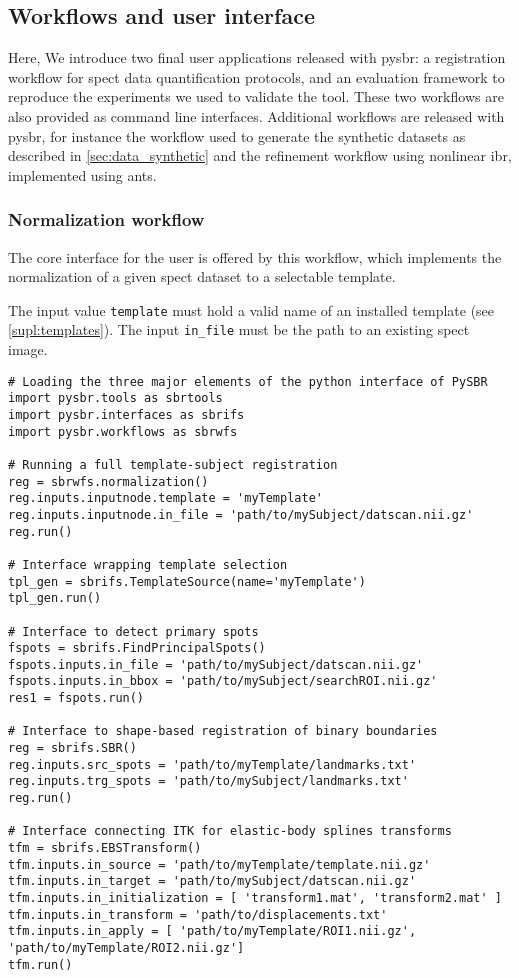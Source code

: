 \documentclass{frontiers}
\begin{document}
\subsection{Workflows and user interface}
\label{supl:user_interface}

Here, We introduce two final user
  applications released with \gls*{pysbr}: a registration workflow for
  \gls*{spect} data quantification protocols, and an evaluation framework
  to reproduce the experiments we used to validate the tool.
These two workflows are also provided as command line interfaces.
Additional workflows are released with \gls*{pysbr}, for instance
  the workflow used to generate the synthetic datasets as described
  in \autoref{sec:data_synthetic} and the refinement workflow using
  nonlinear \gls*{ibr}, implemented using \gls*{ants}.

\subsubsection*{Normalization workflow} %
The core interface for the user is offered by this workflow,
  which implements the normalization of a given \gls*{spect} 
  dataset to a selectable template.

The input value \texttt{template} must hold a valid name of an installed 
  template (see \autoref{supl:templates}). 
The input \texttt{in\_file} must be the path to an existing \gls*{spect} image.

\begin{lstlisting}[caption={\label{list:interfaces}\textbf{Execution samples.}}]
# Loading the three major elements of the python interface of PySBR
import pysbr.tools as sbrtools
import pysbr.interfaces as sbrifs
import pysbr.workflows as sbrwfs

# Running a full template-subject registration
reg = sbrwfs.normalization()
reg.inputs.inputnode.template = 'myTemplate'
reg.inputs.inputnode.in_file = 'path/to/mySubject/datscan.nii.gz'
reg.run()

# Interface wrapping template selection
tpl_gen = sbrifs.TemplateSource(name='myTemplate')
tpl_gen.run()

# Interface to detect primary spots
fspots = sbrifs.FindPrincipalSpots()
fspots.inputs.in_file = 'path/to/mySubject/datscan.nii.gz'
fspots.inputs.in_bbox = 'path/to/mySubject/searchROI.nii.gz'
res1 = fspots.run()

# Interface to shape-based registration of binary boundaries
reg = sbrifs.SBR()
reg.inputs.src_spots = 'path/to/myTemplate/landmarks.txt'
reg.inputs.trg_spots = 'path/to/mySubject/landmarks.txt'
reg.run()

# Interface connecting ITK for elastic-body splines transforms
tfm = sbrifs.EBSTransform()
tfm.inputs.in_source = 'path/to/myTemplate/template.nii.gz'
tfm.inputs.in_target = 'path/to/mySubject/datscan.nii.gz'
tfm.inputs.in_initialization = [ 'transform1.mat', 'transform2.mat' ]
tfm.inputs.in_transform = 'path/to/displacements.txt'
tfm.inputs.in_apply = [ 'path/to/myTemplate/ROI1.nii.gz', 'path/to/myTemplate/ROI2.nii.gz']
tfm.run()
\end{lstlisting}
\end{document}
